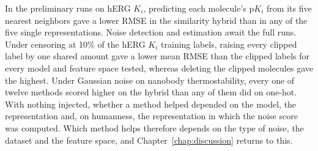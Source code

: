 In the preliminary runs on hERG $K_i$, predicting each molecule's p$K_i$ from its five nearest neighbors gave a lower RMSE in the similarity hybrid than in any of the five single representations. Noise detection and estimation await the full runs. Under censoring at 10\% of the hERG $K_i$ training labels, raising every clipped label by one shared amount gave a lower mean RMSE than the clipped labels for every model and feature space tested, whereas deleting the clipped molecules gave the highest. Under Gaussian noise on nanobody thermostability, every one of twelve methods scored higher on the hybrid than any of them did on one-hot. With nothing injected, whether a method helped depended on the model, the representation and, on humanness, the representation in which the noise score was computed. Which method helps therefore depends on the type of noise, the dataset and the feature space, and Chapter~\ref{chap:discussion} returns to this.


